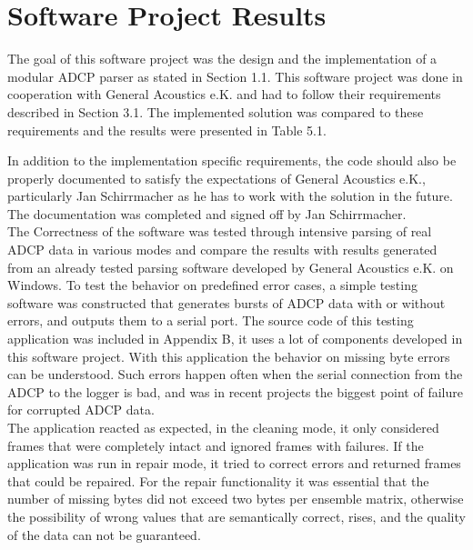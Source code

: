 \section{Software Project Results}

The goal of this software project was the design and the implementation of a modular ADCP parser as stated in Section 1.1. This software project was done in cooperation with General Acoustics e.K. and had to follow their requirements described in Section 3.1. The implemented solution was compared to these requirements and the results were presented in Table 5.1.

In addition to the implementation specific requirements, the code should also be properly documented to satisfy the expectations of General Acoustics e.K., particularly Jan Schirrmacher as he has to work with the solution in the future. The documentation was completed and signed off by Jan Schirrmacher.\\
The Correctness of the software was tested through intensive parsing of real ADCP data in various modes and compare the results with results generated from an already tested parsing software developed by General Acoustics e.K. on Windows. To test the behavior on predefined error cases, a simple testing software was constructed that generates bursts of ADCP data with or without errors, and outputs them to a serial port. The source code of this testing application was included in Appendix B, it uses a lot of components developed in this software project. With this application the behavior on missing byte errors can be understood. Such errors happen often when the serial connection from the ADCP to the logger is bad, and was in recent projects the biggest point of failure for corrupted ADCP data.\\
The application reacted as expected, in the cleaning mode, it only considered frames that were completely intact and ignored frames with failures. If the application was run in repair mode, it tried to correct errors and returned frames that could be repaired. For the repair functionality it was essential that the number of missing bytes did not exceed two bytes per ensemble matrix, otherwise the possibility of wrong values that are semantically correct, rises, and the quality of the data can not be guaranteed.\\

